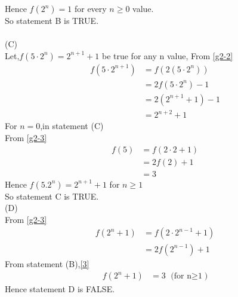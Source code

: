 \documentclass[journal,12pt,twocolumn]{IEEEtran}
\theoremstyle{remark}
\begin{document}
Hence $f(2^n)=1$ for every $n\geq0$ value.\\
So statement B is TRUE.\\
\\(C)\\
Let,$f(5\cdot2^n)=2^{n+1}+1$ be true for any n value,
From \eqref{g2-2}
\begin{align}
	f(5\cdot2^{n+1})&=f(2(5\cdot2^n))\\
	&=2f(5\cdot2^n)-1\\
        &=2(2^{n+1}+1)-1\\
        &=2^{n+2}+1
\end{align}
For $n=0$,in statement (C)\\From \eqref{g2-3}
\begin{align}
	f(5)&=f(2\cdot2+1)\\
        &=2f(2)+1\\
        &=3
\end{align}
Hence $f(5.2^n)=2^{n+1}+1$ for $n\geq1$\\
So statement C is TRUE.\\
(D)\\
From \eqref{g2-3}
\begin{align}
	f(2^n+1)&=f(2\cdot2^{n-1}+1)\label{3}\\
	&=2f(2^{n-1})+1
\end{align}
From statement (B),\eqref{3}
\begin{align}
	f(2^n+1)&=3\text{  (for n$\geq$1})
\end{align}
Hence statement D is FALSE.
\end{document}
